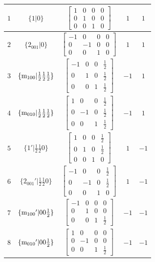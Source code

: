 \documentclass[fleqn,8pt]{jsarticle}
\begin{document}
\begin{longtable}{ccccc}
$ 1 $ & $ \{1|0\} $ & $ \begin{bmatrix} 1 & 0 & 0 & 0 \\ 0 & 1 & 0 & 0 \\ 0 & 0 & 1 & 0 \end{bmatrix} $ & $ 1 $ & $ 1 $ \\ \hline
$ 2 $ & $ \{2{}_{001}|0\} $ & $ \begin{bmatrix} -1 & 0 & 0 & 0 \\ 0 & -1 & 0 & 0 \\ 0 & 0 & 1 & 0 \end{bmatrix} $ & $ 1 $ & $ 1 $ \\ \hline
$ 3 $ & $ \{{\rm m}_{100}|\frac{1}{2} \frac{1}{2} \frac{1}{2}\} $ & $ \begin{bmatrix} -1 & 0 & 0 & \frac{1}{2} \\ 0 & 1 & 0 & \frac{1}{2} \\ 0 & 0 & 1 & \frac{1}{2} \end{bmatrix} $ & $ -1 $ & $ 1 $ \\ \hline
$ 4 $ & $ \{{\rm m}_{010}|\frac{1}{2} \frac{1}{2} \frac{1}{2}\} $ & $ \begin{bmatrix} 1 & 0 & 0 & \frac{1}{2} \\ 0 & -1 & 0 & \frac{1}{2} \\ 0 & 0 & 1 & \frac{1}{2} \end{bmatrix} $ & $ -1 $ & $ 1 $ \\ \hline
$ 5 $ & $ \{1{}'|\frac{1}{2} \frac{1}{2} 0\} $ & $ \begin{bmatrix} 1 & 0 & 0 & \frac{1}{2} \\ 0 & 1 & 0 & \frac{1}{2} \\ 0 & 0 & 1 & 0 \end{bmatrix} $ & $ 1 $ & $ -1 $ \\ \hline
$ 6 $ & $ \{2{}_{001}{}'|\frac{1}{2} \frac{1}{2} 0\} $ & $ \begin{bmatrix} -1 & 0 & 0 & \frac{1}{2} \\ 0 & -1 & 0 & \frac{1}{2} \\ 0 & 0 & 1 & 0 \end{bmatrix} $ & $ 1 $ & $ -1 $ \\ \hline
$ 7 $ & $ \{{\rm m}_{100}{}'|0 0 \frac{1}{2}\} $ & $ \begin{bmatrix} -1 & 0 & 0 & 0 \\ 0 & 1 & 0 & 0 \\ 0 & 0 & 1 & \frac{1}{2} \end{bmatrix} $ & $ -1 $ & $ -1 $ \\ \hline
$ 8 $ & $ \{{\rm m}_{010}{}'|0 0 \frac{1}{2}\} $ & $ \begin{bmatrix} 1 & 0 & 0 & 0 \\ 0 & -1 & 0 & 0 \\ 0 & 0 & 1 & \frac{1}{2} \end{bmatrix} $ & $ -1 $ & $ -1 $ \\
\end{longtable}
\end{document}
